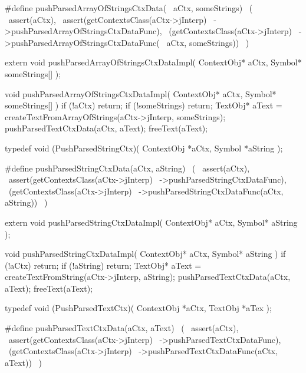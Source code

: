 #define pushParsedArrayOfStringsCtxData(      \
  aCtx, someStrings)                          \
  (                                           \
    assert(aCtx),                             \
    assert(getContextsClass(aCtx->jInterp)    \
      ->pushParsedArrayOfStringsCtxDataFunc), \
    (getContextsClass(aCtx->jInterp)          \
      ->pushParsedArrayOfStringsCtxDataFunc(  \
        aCtx, someStrings))                   \
  )
\stopCHeader

\setCHeaderStream{private}
\startCHeader
extern void pushParsedArrayOfStringsCtxDataImpl(
  ContextObj* aCtx,
  Symbol* someStrings[]
);
\stopCHeader
{}

\startCCode
void pushParsedArrayOfStringsCtxDataImpl(
  ContextObj* aCtx,
  Symbol* someStrings[]
) {
  if (!aCtx) return;
  if (!someStrings) return;
  TextObj* aText =
    createTextFromArrayOfStrings(aCtx->jInterp, someStrings);
  pushParsedTextCtxData(aCtx, aText);
  freeText(aText);
}
\stopCCode

\startCHeader
typedef void (PushParsedStringCtx)(
  ContextObj *aCtx,
  Symbol     *aString
);

#define pushParsedStringCtxData(aCtx, aString)      \
  (                                                 \
    assert(aCtx),                                   \
    assert(getContextsClass(aCtx->jInterp)          \
      ->pushParsedStringCtxDataFunc),               \
    (getContextsClass(aCtx->jInterp)                \
      ->pushParsedStringCtxDataFunc(aCtx, aString)) \
  )
\stopCHeader

\startCHeader
extern void pushParsedStringCtxDataImpl(
  ContextObj* aCtx,
  Symbol* aString
);
\stopCHeader
\setCHeaderStream{public}

\startCCode
void pushParsedStringCtxDataImpl(
  ContextObj* aCtx,
  Symbol* aString
) {
  if (!aCtx) return;
  if (!aString) return;
  TextObj* aText =
    createTextFromString(aCtx->jInterp, aString);
  pushParsedTextCtxData(aCtx, aText);
  freeText(aText);
}
\stopCCode

\startCHeader
typedef void (PushParsedTextCtx)(
  ContextObj *aCtx,
  TextObj    *aTex
);

#define pushParsedTextCtxData(aCtx, aText)      \
  (                                             \
    assert(aCtx),                               \
    assert(getContextsClass(aCtx->jInterp)      \
      ->pushParsedTextCtxDataFunc),             \
    (getContextsClass(aCtx->jInterp)            \
      ->pushParsedTextCtxDataFunc(aCtx, aText)) \
  )
\stopCHeader

